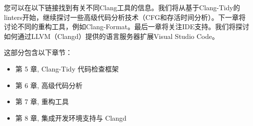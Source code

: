 您可以在以下链接找到有关不同Clang工具的信息。我们将从基于Clang-Tidy的linters开始，继续探讨一些高级代码分析技术（CFG和存活时间分析）。下一章将讨论不同的重构工具，例如Clang-Format。最后一章将关注IDE支持。我们将探讨如何通过LLVM（Clangd）提供的语言服务器扩展Visual Studio Code。

这部分包含以下章节：

\begin{itemize}
\item
第 5 章, Clang-Tidy 代码检查框架

\item
第 6 章, 高级代码分析

\item
第 7 章, 重构工具

\item
第 8 章, 集成开发环境支持与 Clangd
\end{itemize}